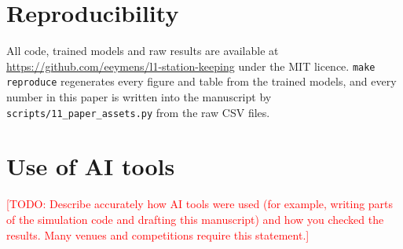\documentclass[11pt,a4paper]{article}
\newcommand{\todo}[1]{\textcolor{red}{[TODO: #1]}}
\begin{document}
\section*{Reproducibility}
All code, trained models and raw results are available at
\url{https://github.com/eeymens/l1-station-keeping} under the MIT licence.
\texttt{make reproduce} regenerates every figure and table from the trained
models, and every number in this paper is written into the manuscript by
\texttt{scripts/11\_paper\_assets.py} from the raw CSV files.

\section*{Use of AI tools}
\todo{Describe accurately how AI tools were used (for example, writing parts of
the simulation code and drafting this manuscript) and how you checked the
results. Many venues and competitions require this statement.}



\end{document}
